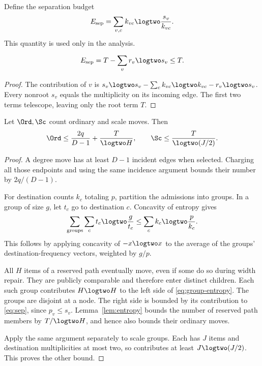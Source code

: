 Define the separation budget
\begin{equation}
                     E_{\mathrm{sep}}
                     =\sum_{v,c}k_{vc}\logtwo\frac{s_v}{k_{vc}}.
\label{eq:sep}
\end{equation}
This quantity is used only in the analysis.

\begin{lemma}
\label{lem:entropy}
\[
                   E_{\mathrm{sep}}
                   =T-\sum_v r_v\logtwo s_v\leq T.
\]
\end{lemma}
\begin{proof}
The contribution of $v$ is
$s_v\logtwo s_v-\sum_c k_{vc}\logtwo k_{vc}-r_v\logtwo s_v$.
Every nonroot $s_v$ equals the multiplicity on its incoming edge.
The first two terms telescope, leaving only the root term $T$.
\end{proof}

\begin{lemma}
\label{lem:rare}
Let $\Ord,\Sc$ count ordinary and scale moves. Then
\begin{equation}
 \Ord\leq\frac{2q}{D-1}+\frac{T}{\logtwo H},
 \qquad
 \Sc\leq\frac{T}{\logtwo(J/2)}.
\label{eq:rare}
\end{equation}
\end{lemma}
\begin{proof}
A degree move has at least $D-1$ incident edges when selected. Charging
all those endpoints and using the same incidence argument bounds their
number by $2q/(D-1)$.

For destination counts $k_c$ totaling $p$, partition the admissions into
groups. In a group of size $g$, let $t_c$ go to destination $c$.
Concavity of entropy gives
\begin{equation}
            \sum_{\mathrm{groups}}\sum_c t_c\logtwo\frac{g}{t_c}
            \leq\sum_c k_c\logtwo\frac{p}{k_c}.
\label{eq:group-entropy}
\end{equation}
This follows by applying concavity of $-x\logtwo x$ to the average of the
groups' destination-frequency vectors, weighted by $g/p$.

All $H$ items of a reserved path eventually move, even if some do so during
width repair. They are publicly comparable and therefore enter distinct
children. Each such group contributes $H\logtwo H$ to the left side of
\eqref{eq:group-entropy}. The groups are disjoint at a node. The right
side is bounded by its contribution to \eqref{eq:sep}, since $p_v\leq s_v$.
Lemma~\ref{lem:entropy} bounds the number of reserved path members by
$T/\logtwo H$, and hence also bounds their ordinary moves.

Apply the same argument separately to scale groups. Each has $J$ items
and destination multiplicities at most two, so contributes at least
$J\logtwo(J/2)$. This proves the other bound.
\end{proof}

